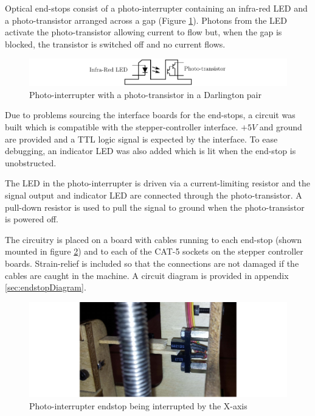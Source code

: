 			Optical end-stops consist of a photo-interrupter containing an infra-red
			LED and a photo-transistor arranged across a gap (Figure
			\ref{fig:endstop}). Photons from the LED activate the photo-transistor
			allowing current to flow but, when the gap is blocked, the transistor is
			switched off and no current flows.
			
			\begin{figure}
				\includegraphics[width=1\textwidth]{diagrams/endstop.pdf}
				\caption{Photo-interrupter with a photo-transistor in a Darlington pair}
				\label{fig:endstop}
			\end{figure}
			
			Due to problems sourcing the interface boards for the end-stops, a circuit
			was built which is compatible with the stepper-controller interface. $+5V$
			and ground are provided and a TTL logic signal is expected by the
			interface. To ease debugging, an indicator LED was also added which is lit
			when the end-stop is unobstructed.
			
			The LED in the photo-interrupter is driven via a current-limiting
			resistor and the signal output and indicator LED are connected through
			the photo-transistor. A pull-down resistor is used to pull the signal
			to ground when the photo-transistor is powered off.
			
			The circuitry is placed on a board with cables running to each end-stop
			(shown mounted in figure \ref{fig:endstopInstalled}) and to each of the
			CAT-5 sockets on the stepper controller boards. Strain-relief is included
			so that the connections are not damaged if the cables are caught in the
			machine. A circuit diagram is provided in appendix
			\ref{sec:endstopDiagram}.
			
			\begin{figure}
				\includegraphics[width=1\textwidth]{diagrams/endstopInstalled.pdf}
				\caption{Photo-interrupter endstop being interrupted by the X-axis}
				\label{fig:endstopInstalled}
			\end{figure}
			
